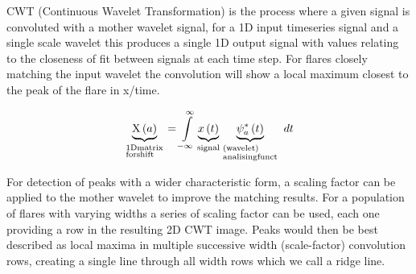 \documentclass[namedreferences]{solarphysics}
\begin{document}
\begin{article}
CWT (Continuous Wavelet Transformation) is the process where a given signal is convoluted with a mother wavelet signal, for a 1D input timeseries signal and a single scale wavelet this produces a single 1D output signal with values relating to the closeness of fit between signals at each time step. For flares closely matching the input wavelet the convolution will show a local maximum closest to the peak of the flare in x/time.

\[\underbrace {{\rm{X}}\left( a \right)}_{\scriptstyle{\rm{1D matrix}}\hfill\atop
	\scriptstyle{\rm{for shift}}\hfill} = \int\limits_{ - \infty }^\infty  {\underbrace {x\left( t \right)}_{{\rm{signal}}}\underbrace {\psi _a^ * \left( t \right)}_{\scriptstyle{\rm{    (wavelet)}}\hfill\atop
		\scriptstyle{\rm{analising funct}}\hfill}\;dt} \]

For detection of peaks with a wider characteristic form, a scaling factor can be applied to the mother wavelet to improve the matching results. For a population of flares with varying widths a series of scaling factor can be used, each one providing a row in the resulting 2D CWT image.
Peaks would then be best described as local maxima in multiple successive width (scale-factor) convolution rows, creating a single line through all width rows which we call a ridge line.


\end{article}
\end{document}
